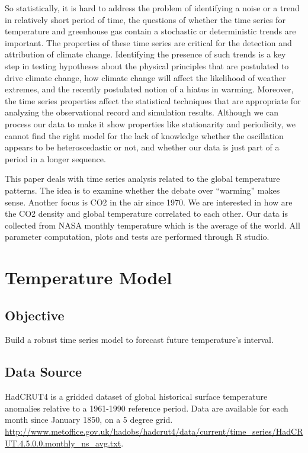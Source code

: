 \documentclass[a4paper,11pt]{article}
\begin{document}
So statistically, it is hard to address the problem of identifying a noise or a trend in relatively short period of time, the questions of whether the time series for temperature and greenhouse gas contain a stochastic or deterministic trends are important. The properties of these time series are critical for the detection and attribution of climate change. Identifying the presence of such trends is a key step in testing hypotheses about the physical principles that are postulated to drive climate change, how climate change will affect the likelihood of weather extremes, and the recently postulated notion of a hiatus in warming. Moreover, the time series properties affect the statistical techniques that are appropriate for analyzing the observational record and simulation results. Although we can process our data to make it show properties like stationarity and periodicity, we cannot find the right model for the lack of knowledge whether the oscillation appears to be heteroscedastic or not, and whether our data is just part of a period in a longer sequence.\par
This paper deals with time series analysis related to the global temperature patterns. The idea is to examine whether the debate over “warming” makes sense. Another focus is CO2 in the air since 1970. We are interested in how are the CO2 density and global temperature correlated to each other. Our data is collected from NASA monthly temperature which is the average of the world. All parameter computation, plots and tests are performed through R studio.\par



\section{Temperature Model}
\subsection{Objective}
Build a robust time series model to forecast future temperature's interval. 


\subsection{Data Source}
HadCRUT4 is a gridded dataset of global historical surface temperature anomalies relative to a 1961-1990 reference period. Data are available for each month since January 1850, on a 5 degree grid. \url{http://www.metoffice.gov.uk/hadobs/hadcrut4/data/current/time_series/HadCRUT.4.5.0.0.monthly_ns_avg.txt}.
\end{document}
